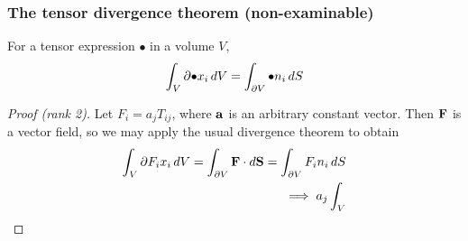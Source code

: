 \documentclass{../../template/note}
\begin{document}
    \subsubsection{The tensor divergence theorem (non-examinable)}
    
    \begin{proposition*}
        For a tensor expression \(\bullet\) in a volume \(V\),
        \begin{align*}
            \int_V \partial{\bullet}{x_i} \,d{V} = \int_{\partial V} \bullet n_i \,d{S}
        \end{align*}
    \end{proposition*}
    
    \begin{proof}[Proof (rank 2)]
        Let \(F_i = a_j T_{ij}\), where \(\V a\) is an arbitrary constant vector. Then \(\V F\) is a vector field, so we may apply the usual divergence theorem to obtain
        \begin{align*}
            \int_V \pr{F_i}{x_i} \D V = \int_{\pr V} \V F \cdot d\V S = \int_{\pr V} F_i n_i \D S \\
            \implies a_j \int_V 
        \end{align*}
        
        
    \end{proof}
    
    
    
    
    

    
    
    
    
    
    
    
    
\end{document}
